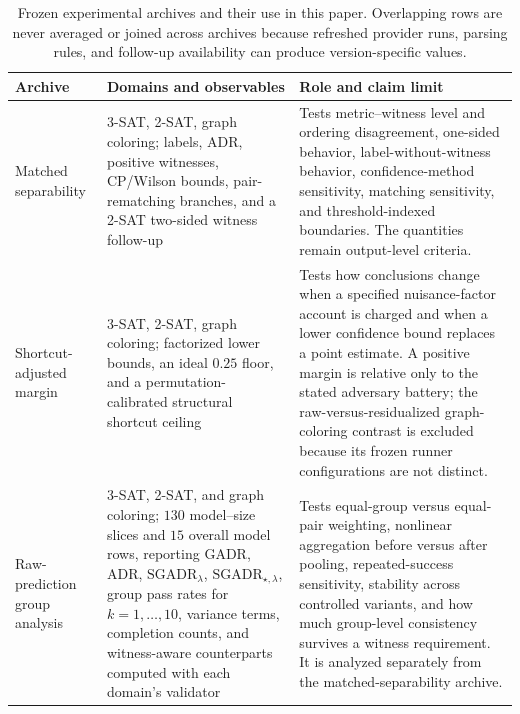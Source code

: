 \documentclass[acmsmall,screen,review,anonymous]{acmart}
\newcounter{experiment}
\begin{document}
\begin{table}[t]
\centering
\caption{Frozen experimental archives and their use in this paper. Overlapping
rows are never averaged or joined across archives because refreshed provider
runs, parsing rules, and follow-up availability can produce version-specific
values.}
\label{tab:experimental-archives}
\renewcommand{\arraystretch}{1.10}
\begin{tabularx}{\textwidth}{p{}p{}X}
\toprule
Archive & Domains and observables & Role and claim limit \\
\midrule
Matched separability
& 3-SAT, 2-SAT, graph coloring; labels, ADR, positive witnesses,
CP/Wilson bounds, pair-rematching branches, and a 2-SAT two-sided witness
follow-up
& Tests metric--witness level and ordering disagreement, one-sided behavior,
label-without-witness behavior, confidence-method sensitivity, matching
sensitivity, and threshold-indexed boundaries. The quantities remain
output-level criteria.\\
Shortcut-adjusted margin
& 3-SAT, 2-SAT, graph coloring; factorized lower bounds, an ideal \(0.25\)
floor, and a permutation-calibrated structural shortcut ceiling
& Tests how conclusions change when a specified nuisance-factor account is
charged and when a lower confidence bound replaces a point estimate. A
positive margin is relative only to the stated adversary battery; the
raw-versus-residualized graph-coloring contrast is excluded because its frozen
runner configurations are not distinct.\\
Raw-prediction group analysis
& 3-SAT, 2-SAT, and graph coloring; \(130\) model--size slices and \(15\)
overall model rows, reporting GADR, ADR,
\(\mathrm{SGADR}_{\lambda}\), \(\mathrm{SGADR}_{\star,\lambda}\),
group pass rates for \(k=1,\ldots,10\), variance terms, completion counts,
and witness-aware counterparts computed with each domain's validator
& Tests equal-group versus equal-pair weighting, nonlinear aggregation before
versus after pooling, repeated-success sensitivity, stability across
controlled variants, and how much group-level consistency survives a witness
requirement. It is analyzed separately from the matched-separability
archive.\\
\bottomrule
\end{tabularx}
\end{table}
\end{document}

